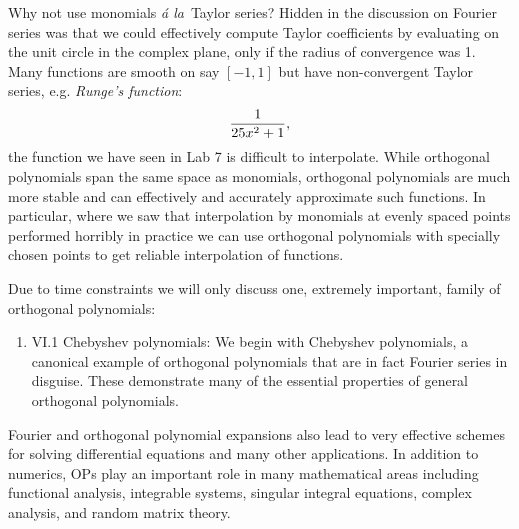 \documentclass[12pt,a4paper]{book}
\def\ala{{\it \'a la}}
\theoremstyle{definition}
\begin{document}
Why not use monomials \ala\  Taylor series? Hidden in the discussion on Fourier series was that we could effectively
compute Taylor coefficients by evaluating on the unit circle in the complex plane, only if the radius of convergence
was 1. Many functions are smooth on say $[-1,1]$ but have non-convergent Taylor series, e.g.  {\it Runge's function}:
$$
{1 \over 25x^2 + 1},
$$
the function we have seen in Lab 7 is difficult to interpolate. While orthogonal polynomials span the same space as monomials, orthogonal polynomials are much more stable and can effectively and accurately
approximate such functions. In particular, where we saw that interpolation
by monomials at evenly spaced points performed horribly in practice we can use orthogonal polynomials
with specially chosen points to get reliable interpolation of functions. 

Due to time constraints we will only discuss one, extremely important, family of orthogonal polynomials:



\begin{enumerate}
    \item VI.1 Chebyshev polynomials: We begin with Chebyshev polynomials, a canonical example of orthogonal polynomials that are in fact Fourier series in disguise. These demonstrate many of the essential properties of general orthogonal polynomials.
    \end{enumerate}






Fourier and orthogonal polynomial expansions also lead to very effective schemes for solving differential equations
and many other applications. In addition to numerics, OPs play an important role in many mathematical areas
including functional analysis, integrable systems, singular integral equations,
complex analysis, and random matrix theory.
\end{document}
